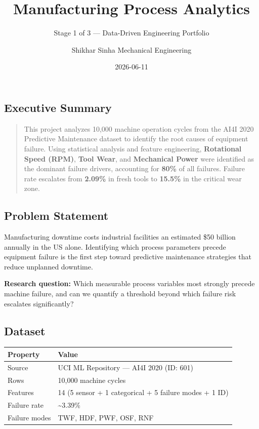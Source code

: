 \documentclass[
]{article}
\title{Manufacturing Process Analytics}
\subtitle{Stage 1 of 3 --- Data-Driven Engineering Portfolio}
\author{Shikhar Sinha \textbar{} Mechanical Engineering}
\date{2026-06-11}
\newcounter{none} %
\begin{document}
\maketitle


\subsection{Executive Summary}\label{executive-summary}

\begin{quote}
This project analyzes 10,000 machine operation cycles from the AI4I 2020
Predictive Maintenance dataset to identify the root causes of equipment
failure. Using statistical analysis and feature engineering,
\textbf{Rotational Speed (RPM)}, \textbf{Tool Wear}, and
\textbf{Mechanical Power} were identified as the dominant failure
drivers, accounting for \textbf{80\%} of all failures. Failure rate
escalates from \textbf{2.09\%} in fresh tools to \textbf{15.5\%} in the
critical wear zone.
\end{quote}

\subsection{Problem Statement}\label{problem-statement}

Manufacturing downtime costs industrial facilities an estimated \$50
billion annually in the US alone. Identifying which process parameters
precede equipment failure is the first step toward predictive
maintenance strategies that reduce unplanned downtime.

\textbf{Research question:} Which measurable process variables most
strongly precede machine failure, and can we quantify a threshold beyond
which failure risk escalates significantly?

\subsection{Dataset}\label{dataset}

{\def\LTcaptype{none} %
\begin{longtable}[]{@{}ll@{}}
\toprule\noalign{}
Property & Value \\
\midrule\noalign{}
\endhead
\bottomrule\noalign{}
\endlastfoot
Source & UCI ML Repository --- AI4I 2020 (ID: 601) \\
Rows & 10,000 machine cycles \\
Features & 14 (5 sensor + 1 categorical + 5 failure modes + 1 ID) \\
Failure rate & \textasciitilde3.39\% \\
Failure modes & TWF, HDF, PWF, OSF, RNF \\
\end{longtable}
}
\end{document}
